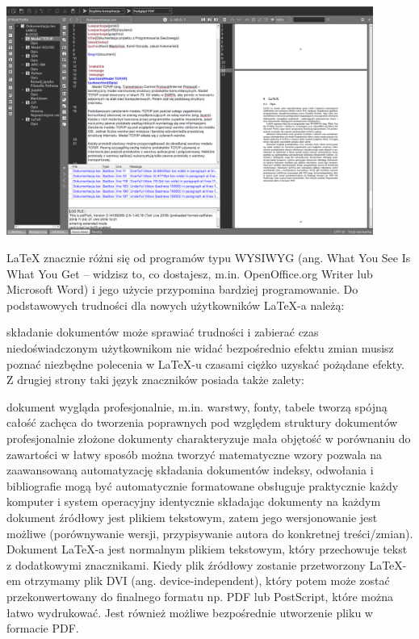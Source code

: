 \documentclass{article}
\begin{document}
\includegraphics[width=0.9\textwidth]{latex.png}
\linebreak

LaTeX znacznie różni się od programów typu WYSIWYG (ang. What You See Is What You Get – widzisz to, co dostajesz, m.in. OpenOffice.org Writer lub Microsoft Word) i jego użycie przypomina bardziej programowanie. Do podstawowych trudności dla nowych użytkowników LaTeX-a należą:

składanie dokumentów może sprawiać trudności i zabierać czas niedoświadczonym użytkownikom
nie widać bezpośrednio efektu zmian
musisz poznać niezbędne polecenia w LaTeX-u
czasami ciężko uzyskać pożądane efekty.
Z drugiej strony taki język znaczników posiada także zalety:

dokument wygląda profesjonalnie, m.in. warstwy, fonty, tabele tworzą spójną całość
zachęca do tworzenia poprawnych pod względem struktury dokumentów
profesjonalnie złożone dokumenty charakteryzuje mała objętość w porównaniu do zawartości
w łatwy sposób można tworzyć matematyczne wzory
pozwala na zaawansowaną automatyzację składania dokumentów
indeksy, odwołania i bibliografie mogą być automatycznie formatowane
obsługuje praktycznie każdy komputer i system operacyjny identycznie składając dokumenty na każdym
dokument źródłowy jest plikiem tekstowym, zatem jego wersjonowanie jest możliwe (porównywanie wersji, przypisywanie autora do konkretnej treści/zmian).
Dokument LaTeX-a jest normalnym plikiem tekstowym, który przechowuje tekst z dodatkowymi znacznikami. Kiedy plik źródłowy zostanie przetworzony LaTeX-em otrzymamy plik DVI (ang. device-independent), który potem może zostać przekonwertowany do finalnego formatu np. PDF lub PostScript, które można łatwo wydrukować. Jest również możliwe bezpośrednie utworzenie pliku w formacie PDF.
\newpage
\end{document}
